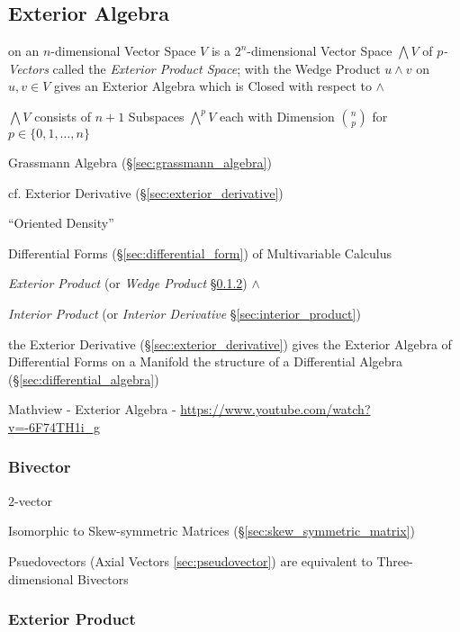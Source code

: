 {{%
\subsection{Exterior Algebra}\label{sec:exterior_algebra}

on an $n$-dimensional Vector Space $V$ is a $2^n$-dimensional Vector Space
$\bigwedge V$ of \emph{$p$-Vectors} called the \emph{Exterior Product Space};
with the Wedge Product $u \wedge v$ on $u,v \in V$ gives an Exterior Algebra
which is Closed with respect to $\wedge$

$\bigwedge V$ consists of $n+1$ Subspaces $\bigwedge^p{V}$ each with Dimension
$\binom{n}{p}$ for $p \in \{0, 1, \ldots, n\}$

Grassmann Algebra (\S\ref{sec:grassmann_algebra})

\fist cf. Exterior Derivative (\S\ref{sec:exterior_derivative}) %

``Oriented Density'' %

Differential Forms (\S\ref{sec:differential_form}) of Multivariable Calculus

\emph{Exterior Product} (or \emph{Wedge Product} \S\ref{sec:exterior_product})
$\wedge$

\emph{Interior Product} (or \emph{Interior Derivative}
\S\ref{sec:interior_product})

the Exterior Derivative (\S\ref{sec:exterior_derivative}) gives the Exterior
Algebra of Differential Forms on a Manifold the structure of a Differential
Algebra (\S\ref{sec:differential_algebra})

\asterism

Mathview - Exterior Algebra - \url{https://www.youtube.com/watch?v=-6F74TH1i_g}



\subsubsection{Bivector}\label{sec:bivector}

$2$-vector

Isomorphic to Skew-symmetric Matrices (\S\ref{sec:skew_symmetric_matrix})

Psuedovectors (Axial Vectors \ref{sec:pseudovector}) are equivalent to
Three-dimensional Bivectors



\subsubsection{Exterior Product}\label{sec:exterior_product}

}}
